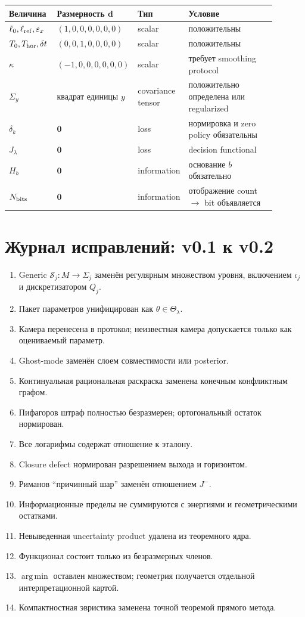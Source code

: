 \documentclass[11pt,a4paper]{article}
\theoremstyle{definition}
\theoremstyle{plain}
\theoremstyle{remark}
\newcommand{\Argmin}{\operatorname*{arg\,min}}
\begin{document}
\begin{longtable}{L{0.18\linewidth}L{0.19\linewidth}L{0.18\linewidth}L{0.34\linewidth}}
\toprule
Величина & Размерность $\bm d$ & Тип & Условие\\
\midrule
\endhead
$\ell_0,\ell_{\rm ref},\varepsilon_x$ & $(1,0,0,0,0,0,0)$ &
scalar & положительны\\
$T_0,T_{\rm hor},\delta t$ & $(0,0,1,0,0,0,0)$ &
scalar & положительны\\
$\kappa$ & $(-1,0,0,0,0,0,0)$ &
scalar & требует smoothing protocol\\
$\Sigma_y$ & квадрат единицы $y$ &
covariance tensor & положительно определена или regularized\\
$\delta_k$ & $\bm 0$ & loss & нормировка и zero policy обязательны\\
$J_\lambda$ & $\bm 0$ & loss & decision functional\\
$H_b$ & $\bm 0$ & information & основание $b$ обязательно\\
$N_{\rm bits}$ & $\bm 0$ & information &
отображение count $\to$ bit объявляется\\
\bottomrule
\end{longtable}

\section{Журнал исправлений: v0.1 к v0.2}

\begin{enumerate}[leftmargin=*]
\item Generic $\mathcal S_j:M\to\Sigma_j$ заменён регулярным множеством
уровня, включением $\iota_j$ и дискретизатором $Q_j$.
\item Пакет параметров унифицирован как $\theta\in\Theta_\lambda$.
\item Камера перенесена в протокол; неизвестная камера допускается только
как оцениваемый параметр.
\item Ghost-mode заменён слоем совместимости или posterior.
\item Континуальная рациональная раскраска заменена конечным конфликтным
графом.
\item Пифагоров штраф полностью безразмерен; ортогональный остаток
нормирован.
\item Все логарифмы содержат отношение к эталону.
\item Closure defect нормирован разрешением выхода и горизонтом.
\item Риманов ``причинный шар'' заменён отношением $J^-$.
\item Информационные пределы не суммируются с энергиями и геометрическими
остатками.
\item Невыведенная uncertainty product удалена из теоремного ядра.
\item Функционал состоит только из безразмерных членов.
\item $\Argmin$ оставлен множеством; геометрия получается отдельной
интерпретационной картой.
\item Компактностная эвристика заменена точной теоремой прямого метода.
\end{enumerate}
\end{document}
